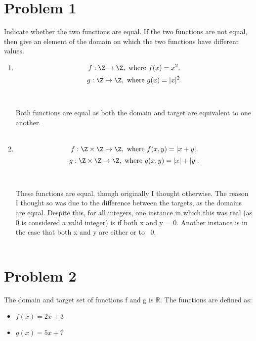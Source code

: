 \section*{Problem 1}

Indicate whether the two functions are equal. If the two functions are not equal, then give an element of the domain on which the two functions have different values.\\
 \begin{enumerate}[label=(\alph*)]
   \item
\[ f: \Z \to \Z, \text{ where } f(x)= x^2.\]
\[ g: \Z \to \Z, \text{ where } g(x)= |x|^2.\]\\\\
Both functions are equal as both the domain and target are equivalent to one another.
\\\\
\item  \[ f: \Z\times \Z \to \Z, \text{ where } f(x,y)= |x+y|.\]
\[ g: \Z\times \Z \to \Z, \text{ where } g(x,y)= |x|+|y|.\]\\\\
These functions are equal, though originally I thought otherwise. The reason I thought so was due to the difference between the targets, as the domains are equal. Despite this, for all integers, one instance in which this was real (as 0 is considered a valid integer) is if both x and y = 0. Another instance is in the case that both x and y are either \geq or \leq to \ 0.
\\\\
\end{enumerate}

 \newpage

\section*{Problem 2}

The domain and target set of functions f and g is $\mathbb{R}$. The functions are defined as:
\begin{itemize}
  \item $f(x) = 2x + 3$\\

  \item $g(x) = 5x + 7$\\


\end{itemize}

